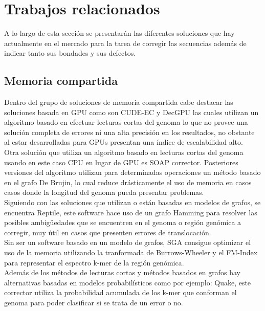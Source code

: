\documentclass[conference]{IEEEtran}
\begin{document}
\section{Trabajos relacionados}

A lo largo de esta sección se presentarán las diferentes soluciones que hay actualmente en el mercado para la tarea de corregir las secuencias además de indicar tanto sus bondades y sus defectos.

\subsection{Memoria compartida}

Dentro del grupo de soluciones de memoria compartida cabe destacar las soluciones basada en GPU como son CUDE-EC y DecGPU las cuales utilizan un algoritmo basado en efectuar lecturas cortas del genoma lo que no provee una solución completa de errores ni una alta precisión en los resultados, no obstante al estar desarrolladas para GPUs presentan una índice de escalabilidad alto.\\

Otra solución que utiliza un algoritmo basado en lecturas cortas del genoma usando en este caso CPU en lugar de GPU es SOAP corrector. Posteriores versiones del algoritmo utilizan para determinadas operaciones un método basado en el grafo De Brujin, lo cual reduce drásticamente el uso de memoria en casos casos donde la longitud del genoma pueda presentar problemas.\\

Siguiendo con las soluciones que utilizan o están basadas en modelos de grafos, se encuentra Reptile, este software hace uso de un grafo Hamming para resolver las posibles ambigüedades que se encuentren en el genoma o región genómica a corregir, muy útil en casos que presenten errores de translocación.\\

Sin ser un software basado en un modelo de grafos, SGA consigue optimizar el uso de la memoria utilizando la tranformada de Burrows-Wheeler y el FM-Index para representar el espectro k-mer de la región genómica.\\

Además de los métodos de lecturas cortas y métodos basados en grafos hay alternativas basadas en modelos probabilísticos como por ejemplo: Quake, este corrector utiliza la probabilidad acumulada de los k-mer que conforman el genoma para poder clasificar si se trata de un error o no.\\
\end{document}
